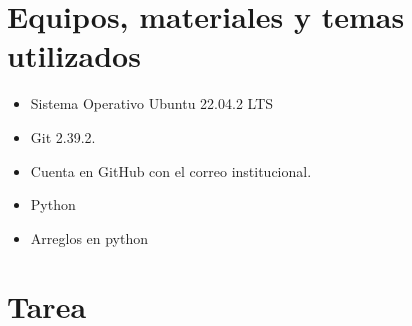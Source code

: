 \documentclass{article}
\begin{document}
\section{Equipos, materiales y temas utilizados}
\begin{itemize}
	\item Sistema Operativo Ubuntu 22.04.2 LTS
	\item Git 2.39.2.
	\item Cuenta en GitHub con el correo institucional.
	\item Python
	\item Arreglos en python
\end{itemize}

\section{Tarea}
\end{document}

